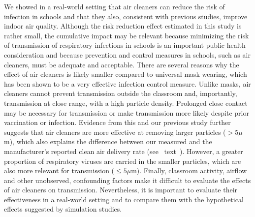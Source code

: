 \documentclass[fleqn,11pt]{wlscirep}
\begin{document}
We showed in a real-world setting that air cleaners can reduce the risk of infection in schools and that they also, consistent with previous  studies\cite{Park2020Build,Buising2022InfContr,Banholzer2023PLoSMed}, improve indoor air quality. Although the risk reduction effect estimated in this study is rather small, the cumulative impact may be relevant because minimizing the risk of transmission of respiratory infections in schools is an important public health consideration\cite{Beale2023JOMT} and because prevention and control measures in schools, such as air cleaners, must be adequate and acceptable\cite{WHO2020SchoolMeasures}. There are several reasons why the effect of air cleaners is likely smaller compared to \eg universal mask wearing, which has been shown to be a very effective infection control measure\cite{Banholzer2023PLoSMed,Heinsohn2022,Gettings2021,Leung2020NatMed,Milton2013PLoSPathogens}. Unlike masks, air cleaners cannot prevent transmission outside the classroom and, importantly, transmission at close range, with a high particle density. Prolonged close contact may be necessary for transmission\cite{Leung2020NatMed,Brankston2007LancetID} or make transmission more likely despite prior vaccination or infection\cite{Lind2023NatCommun}. Evidence from this and our previous study\cite{Banholzer2023PLoSMed} further suggests that air cleaners are more effective at removing larger particles ($>5\mu$m), which also explains the difference between our measured and the manufacturer's reported clean air delivery rate (see \supp~text~). However, a greater proportion of respiratory viruses are carried in the smaller particles, which are also more relevant for transmission ($\leq5\mu$m)\cite{Fennelly2020}. Finally, classroom activity, airflow and other unobserved, confounding factors make it difficult to evaluate the effects of air cleaners on transmission. Nevertheless, it is important to evaluate their effectiveness in a real-world setting and to compare them with the hypothetical effects suggested by simulation studies\cite{Lindsley2021,Cortellessa2023Build}.

\end{document}
